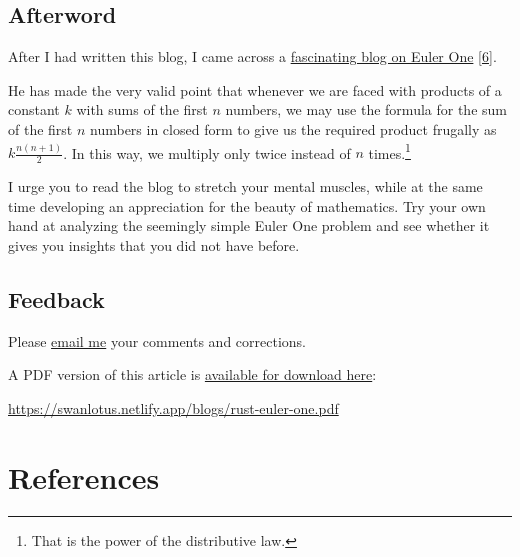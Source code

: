 \documentclass[
  a4paper,
]{article}
\begin{document}
\hypertarget{afterword}{%
\subsection{Afterword}\label{afterword}}

After I had written this blog, I came across a
\href{https://iambryanhaney.medium.com/another-unreasonable-deep-dive-into-project-euler-problem-1-51a3a841ad67\#:~:text=The\%20Problem,0\%20modulo\%203\%20or\%205}{fascinating
blog on Euler One} {[}\protect\hyperlink{ref-haney2020}{6}{]}.

He has made the very valid point that whenever we are faced with
products of a constant \(k\) with sums of the first \(n\) numbers, we
may use the formula for the sum of the first \(n\) numbers in closed
form to give us the required product frugally as
\(k\frac{n(n + 1)}{2}\). In this way, we multiply only twice instead of
\(n\) times.\footnote{That is the power of the distributive law.}

I urge you to read the blog to stretch your mental muscles, while at the
same time developing an appreciation for the beauty of mathematics. Try
your own hand at analyzing the seemingly simple Euler One problem and
see whether it gives you insights that you did not have before.

\hypertarget{feedback}{%
\subsection{Feedback}\label{feedback}}

Please \href{mailto:feedback.swanlotus@gmail.com}{email me} your
comments and corrections.

\noindent A PDF version of this article is
\href{./rust-euler-one.pdf}{available for download here}:

\begin{small}

\begin{sffamily}

\url{https://swanlotus.netlify.app/blogs/rust-euler-one.pdf}

\end{sffamily}

\end{small}

\hypertarget{bibliography}{%
\section*{References}\label{bibliography}}
\end{document}
